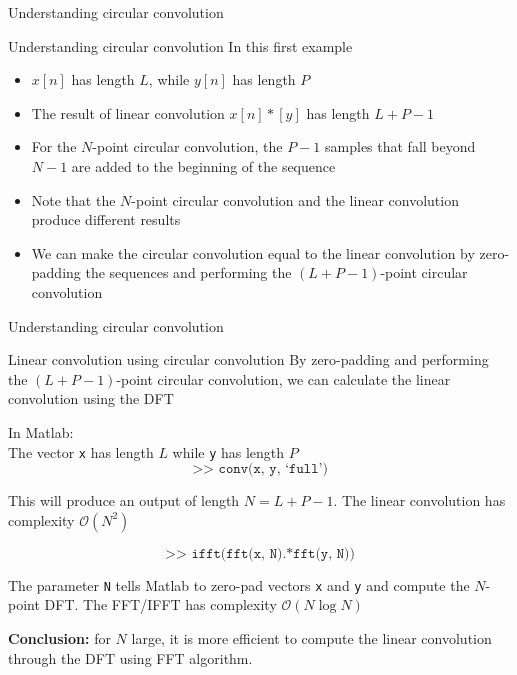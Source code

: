 \documentclass[10pt]{beamer}
\begin{document}
%
\begin{frame}{Understanding circular convolution}
	\begin{center}
		\resizebox{0.65\textwidth}{!}{}
	\end{center}
\end{frame}

\begin{frame}{Understanding circular convolution}
In this first example
\begin{itemize}
	\item $x[n]$ has length $L$, while $y[n]$ has length $P$
	\item The result of linear convolution $x[n]\ast [y]$ has length $L+P-1$
	\item For the $N$-point circular convolution, the {\color{blue2} $P-1$ samples that fall beyond $N-1$} are added to the beginning of the sequence
	\item Note that the $N$-point circular convolution and the linear convolution produce different results
	\item We can make the circular convolution equal to the linear convolution by zero-padding the sequences and performing the $(L+P-1)$-point circular convolution
\end{itemize}
\end{frame}

%
\begin{frame}{Understanding circular convolution}
\begin{center}
	\resizebox{0.65\textwidth}{!}{}
\end{center}
\end{frame}

\begin{frame}{Linear convolution using circular convolution}
By zero-padding and performing the $(L+P-1)$-point circular convolution, we can calculate the linear convolution using the DFT

\vspace{0.25cm}
In Matlab:\\
The vector \texttt{x} has length $L$ while \texttt{y} has length $P$
\begin{equation*}
	\texttt{>> conv(x, y, `full')} \tag{linear convolution}
\end{equation*}

This will produce an output of length $N = L+P-1$. The linear convolution has complexity $\mathcal{O}(N^2)$

\begin{equation*}
\texttt{>> ifft(fft(x, N).*fft(y, N))} \tag{circular convolution}
\end{equation*}

The parameter \texttt{N} tells Matlab to zero-pad vectors \texttt{x} and \texttt{y}  and compute the $N$-point DFT. The FFT/IFFT has complexity $\mathcal{O}(N\log N)$

\vspace{0.25cm}
\textbf{Conclusion:} for $N$ large, it is more efficient to compute the linear convolution through the DFT using FFT algorithm.
\end{frame}
\end{document}
